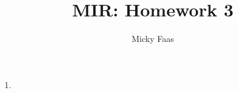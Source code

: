 \documentclass[10pt,a4paper]{article}
\author{Micky Faas}
\title{MIR: Homework 3}
\begin{document}
\maketitle

\begin{enumerate}
\item 

\end{enumerate}
\end{document}
